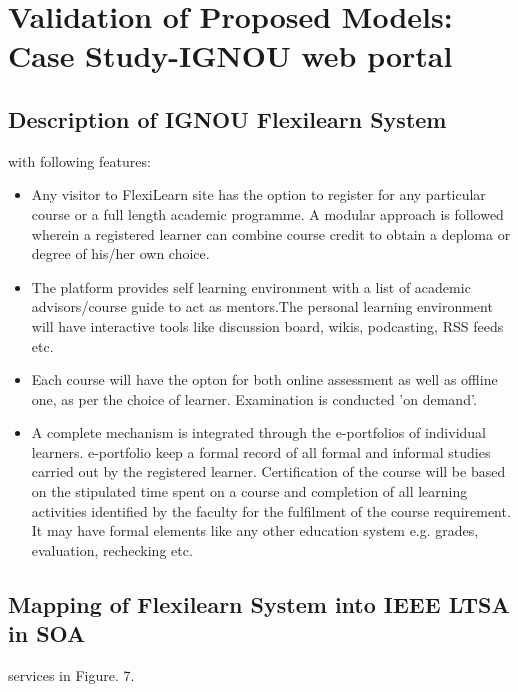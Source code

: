 \chapter{Validation of Proposed Models: Case Study-IGNOU web portal}
\section{Description of IGNOU Flexilearn System}
\Blindtext
 with following features:
\begin{itemize}
 \item Any visitor to FlexiLearn site has the option to register for any particular
course or a full length academic programme. A modular approach is followed
wherein a registered learner can combine course credit to obtain a deploma or
degree of his/her own choice.
\item The platform provides self learning environment with a list of academic advisors/course guide to act as mentors.The personal learning environment will have
interactive tools like discussion board, wikis, podcasting, RSS feeds etc.
\item Each course will have the opton for both online assessment as well as offline
one, as per the choice of learner. Examination is conducted ’on demand’.
 \item A complete mechanism is integrated through the e-portfolios of individual
learners. e-portfolio keep a formal record of all formal and informal studies carried
out by the registered learner. Certification of the course will be based on the
stipulated time spent on a course and completion of all learning activities identified
by the faculty for the fulfilment of the course requirement. It may have formal
elements like any other education system e.g. grades, evaluation, rechecking etc.

\end{itemize}
\section{Mapping of Flexilearn System into IEEE LTSA in SOA}
\blindtext
 services in Figure. 7.


